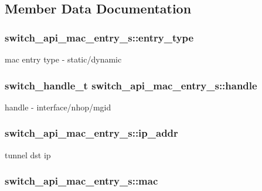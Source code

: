 \subsection{Member Data Documentation}
\hypertarget{structswitch__api__mac__entry__s_a6e81421d19c0e842cc55b1d181fea359}{
\subsubsection[{entry\+\_\+type}]{ switch\+\_\+api\+\_\+mac\+\_\+entry\+\_\+s\+::entry\+\_\+type}}\label{structswitch__api__mac__entry__s_a6e81421d19c0e842cc55b1d181fea359}
mac entry type -\/ static/dynamic \hypertarget{structswitch__api__mac__entry__s_af912c454ac38b9cbdcc0c7620c4f9c0b}{
\subsubsection[{handle}]{\setlength{\rightskip}{0pt plus 5cm}switch\+\_\+handle\+\_\+t switch\+\_\+api\+\_\+mac\+\_\+entry\+\_\+s\+::handle}}\label{structswitch__api__mac__entry__s_af912c454ac38b9cbdcc0c7620c4f9c0b}
handle -\/ interface/nhop/mgid \hypertarget{structswitch__api__mac__entry__s_aa6a4618e39c621f59350753214531f1e}{
\subsubsection[{ip\+\_\+addr}]{ switch\+\_\+api\+\_\+mac\+\_\+entry\+\_\+s\+::ip\+\_\+addr}}\label{structswitch__api__mac__entry__s_aa6a4618e39c621f59350753214531f1e}
tunnel dst ip \hypertarget{structswitch__api__mac__entry__s_a03cf7afcad902dd9fbe9c7a89f0c9c39}{
\subsubsection[{mac}]{ switch\+\_\+api\+\_\+mac\+\_\+entry\+\_\+s\+::mac}}\label{structswitch__api__mac__entry__s_a03cf7afcad902dd9fbe9c7a89f0c9c39}
